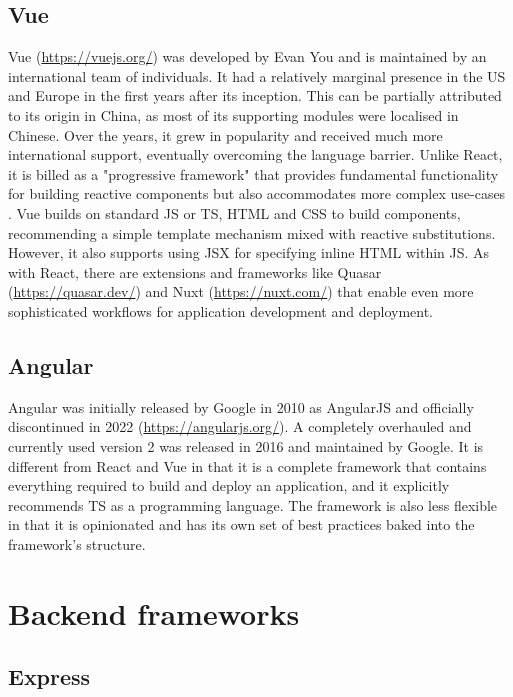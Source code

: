 \subsection{Vue}

Vue (\url{https://vuejs.org/}) was developed by Evan You and is maintained by an international team of individuals. It had a relatively marginal presence in the US and Europe in the first years after its inception. This can be partially attributed to its origin in China, as most of its supporting modules were localised in Chinese. Over the years, it grew in popularity and received much more international support, eventually overcoming the language barrier. Unlike React, it is billed as a "progressive framework" that provides fundamental functionality for building reactive components but also accommodates more complex use-cases \parencite{vueProgressiveFramework}. Vue builds on standard \ac{JS} or \ac{TS}, \ac{HTML} and \ac{CSS} to build components, recommending a simple template mechanism mixed with reactive substitutions. However, it also supports using \ac{JSX} for specifying inline \ac{HTML} within \ac{JS}. As with React, there are extensions and frameworks like Quasar (\url{https://quasar.dev/}) and Nuxt (\url{https://nuxt.com/}) that enable even more sophisticated workflows for application development and deployment.

\subsection{Angular}

Angular was initially released by Google in 2010 as AngularJS and officially discontinued in 2022 (\url{https://angularjs.org/}). A completely overhauled and currently used version 2 was released in 2016 and maintained by Google. It is different from React and Vue in that it is a complete framework that contains everything required to build and deploy an application, and it explicitly recommends \ac{TS} as a programming language. The framework is also less flexible in that it is opinionated and has its own set of best practices baked into the framework's structure.




\section{Backend frameworks}

\subsection{Express}

